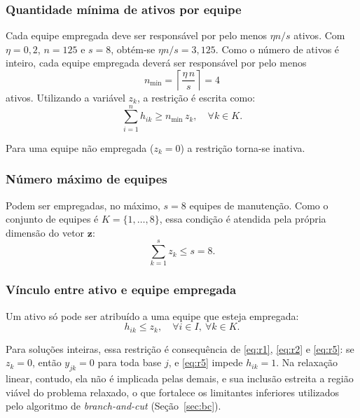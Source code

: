 \documentclass[conference]{IEEEtran}
\begin{document}
\subsubsection{Quantidade mínima de ativos por equipe}
Cada equipe empregada deve ser responsável por pelo menos $\eta n/s$ ativos. Com $\eta = 0{,}2$, $n = 125$ e $s = 8$, obtém-se $\eta n/s = 3{,}125$. Como o número de ativos é inteiro, cada equipe empregada deverá ser responsável por pelo menos
\begin{equation}
n_{\min} = \left\lceil \frac{\eta\, n}{s} \right\rceil = 4
\end{equation}
ativos. Utilizando a variável $z_k$, a restrição é escrita como:
\begin{equation}
\sum_{i=1}^{n} h_{ik} \ge n_{\min}\, z_k, \quad \forall k \in K.
\label{eq:r6}
\end{equation}

Para uma equipe não empregada ($z_k = 0$) a restrição torna-se inativa.

\subsubsection{Número máximo de equipes}
Podem ser empregadas, no máximo, $s = 8$ equipes de manutenção. Como o conjunto de equipes é $K = \{1,\dots,8\}$, essa condição é atendida pela própria dimensão do vetor $\mathbf{z}$:
\begin{equation}
\sum_{k=1}^{s} z_k \le s = 8.
\label{eq:r7}
\end{equation}

\subsubsection{Vínculo entre ativo e equipe empregada}
Um ativo só pode ser atribuído a uma equipe que esteja empregada:
\begin{equation}
h_{ik} \le z_k, \quad \forall i \in I,\ \forall k \in K.
\label{eq:r8}
\end{equation}

Para soluções inteiras, essa restrição é consequência de \eqref{eq:r1}, \eqref{eq:r2} e \eqref{eq:r5}: se $z_k = 0$, então $y_{jk} = 0$ para toda base $j$, e \eqref{eq:r5} impede $h_{ik} = 1$. Na relaxação linear, contudo, ela não é implicada pelas demais, e sua inclusão estreita a região viável do problema relaxado, o que fortalece os limitantes inferiores utilizados pelo algoritmo de \textit{branch-and-cut} (Seção~\ref{sec:bc}).
\end{document}
